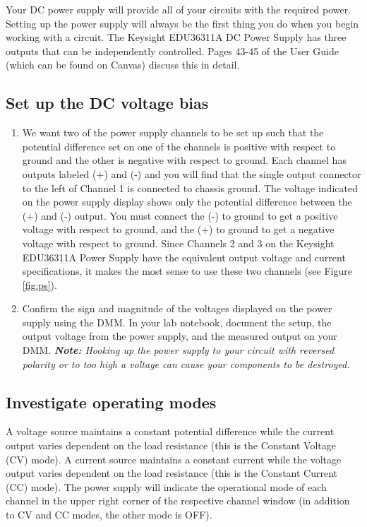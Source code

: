 \documentclass[
]{article}
\begin{document}
Your DC power supply will provide all of your circuits with the required
power. Setting up the power supply will always be the first thing you do
when you begin working with a circuit. The Keysight EDU36311A DC Power
Supply has three outputs that can be independently controlled. Pages
43-45 of the User Guide (which can be found on Canvas) discuss this in
detail.

\hypertarget{set-up-the-dc-voltage-bias}{%
\subsection{Set up the DC voltage
bias}\label{set-up-the-dc-voltage-bias}}

\begin{enumerate}
\def\labelenumi{\arabic{enumi}.}
\item
  We want two of the power supply channels to be set up such that the
  potential difference set on one of the channels is positive with
  respect to ground and the other is negative with respect to ground.
  Each channel has outputs labeled (+) and (-) and you will find that
  the single output connector to the left of Channel 1 is connected to
  chassis ground. The voltage indicated on the power supply display
  shows only the potential difference between the (+) and (-) output.
  You must connect the (-) to ground to get a positive voltage with
  respect to ground, and the (+) to ground to get a negative voltage
  with respect to ground. Since Channels 2 and 3 on the Keysight
  EDU36311A Power Supply have the equivalent output voltage and current
  specifications, it makes the most sense to use these two channels (see
  Figure \ref{fig:ps}).
\item
  Confirm the sign and magnitude of the voltages displayed on the power
  supply using the DMM. In your lab notebook, document the setup, the
  output voltage from the power supply, and the measured output on your
  DMM. \emph{\textbf{Note:} Hooking up the power supply to your circuit
  with reversed polarity or to too high a voltage can cause your
  components to be destroyed.}
\end{enumerate}

\hypertarget{investigate-operating-modes}{%
\subsection{Investigate operating
modes}\label{investigate-operating-modes}}

A voltage source maintains a constant potential difference while the
current output varies dependent on the load resistance (this is the
Constant Voltage (CV) mode). A current source maintains a constant
current while the voltage output varies dependent on the load resistance
(this is the Constant Current (CC) mode). The power supply will indicate
the operational mode of each channel in the upper right corner of the
respective channel window (in addition to CV and CC modes, the other
mode is OFF).
\end{document}
